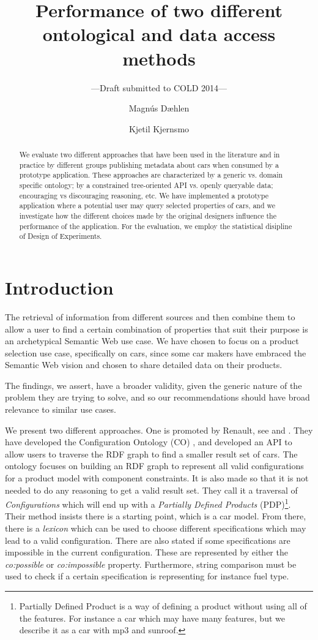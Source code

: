 \documentclass{llncs}
\title{Performance of two different ontological and data access methods}
\author{Magn\'{u}s D\ae hlen \and Kjetil Kjernsmo}
\institute{Department of Informatics,
Postboks 1080 Blindern,
N-0316 Oslo, Norway \email{\{magnudae,kjekje\}@ifi.uio.no} }
\subtitle{---Draft submitted to COLD 2014---}
\begin{document}
\maketitle

\begin{abstract}
  We evaluate two different approaches that have been used in the
  literature and in practice by different groups publishing metadata
  about cars when consumed by a prototype application. These
  approaches are characterized by a generic vs. domain specific
  ontology; by a constrained tree-oriented API vs. openly queryable
  data; encouraging vs discouraging reasoning, etc.  We have
  implemented a prototype application where a potential user may query
  selected properties of cars, and we investigate how the different
  choices made by the original designers influence the performance of
  the application. For the evaluation, we employ the statistical
  disipline of Design of Experiments.

\end{abstract}

\section{Introduction}

The retrieval of information from different sources and then combine
them to allow a user to find a certain combination of properties that
suit their purpose is an archetypical Semantic Web use case. We have
chosen to focus on a product selection use case, specifically on cars,
since some car makers have embraced the Semantic Web vision and chosen
to share detailed data on their products.

The findings, we assert, have a broader validity, given the generic
nature of the problem they are trying to solve, and so our
recommendations should have broad relevance to similar use cases.

We present two different approaches. One is promoted by Renault, see
\cite{SemWebAppRes} and \cite{ren1}. They have developed the
Configuration Ontology (CO) \cite{confOnt}, and developed an API to allow
users to traverse the RDF graph to find a smaller result set of cars.
The ontology focuses on building an RDF graph to represent all valid
configurations for a product model with component constraints.  It is
also made so that it is not needed to do any reasoning to get a valid
result set.  They call it a traversal of \textit{Configurations} which
will end up with a \textit{Partially Defined Products}
(PDP)\footnote{Partially Defined Product is a way of defining a
  product without using all of the features. For instance a car which
  may have many features, but we describe it as a car with mp3 and
  sunroof.}.  Their method insists there is a starting point, which is
a car model. From there, there is a \emph{lexicon} which can be used
to choose different specifications which may lead to a valid
configuration. There are also stated if some specifications are
impossible in the current configuration.  These are represented by
either the \textit{co:possible} or \textit{co:impossible}
property. Furthermore, string comparison must be used to check if a
certain specification is representing for instance fuel type.
\end{document}
